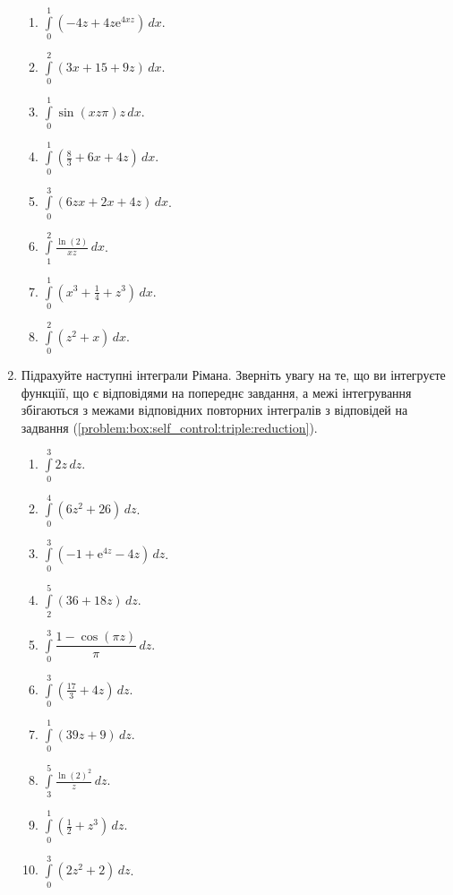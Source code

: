 \begin{enumerate}
\begin{multicols}{2}
\begin{enumerate}[label*=\arabic*.]
        \item $\int\limits_0^1 \left(-4 z+4 z {\mathrm e}^{4 x z}\right) \,dx$.
        \item $\int\limits_0^2 \left(3 x+15+9 z\right) \,dx$.
        \item $\int\limits_0^1 {\sin}{\left(x z \pi \right)} {z} \,dx$.
        \item $\int\limits_0^1 \left(\frac{8}{3}+6 x+4 z\right) \,dx$.
        \item $\int\limits_0^3 \left(6 z x+2 x+4 z\right) \,dx$.
        \item $\int\limits_1^2 \frac{\ln\! \left(2\right)}{x z} \,dx$.
        \item $\int\limits_0^1 \left({x^{3}+\frac{1}{4}+z^{3}}\right) \,dx$.
        \item $\int\limits_0^2 \left(z^{2}+x\right) \,dx$.
    \end{enumerate}
\end{multicols}
\item\label{problem:box:self_control:triple:outer} Підрахуйте наступні інтеграли Рімана. Зверніть увагу на те, що ви інтегруєте функціїї, що є відповідями на попереднє завдання, а межі інтегрування збігаються з межами відповідних повторних інтегралів з відповідей на задвання (\ref{problem:box:self_control:triple:reduction}).
\begin{multicols}{2}
    \begin{enumerate}[label*=\arabic*.]
        \item $\int\limits_0^3 2z \,dz$.
        \item $\int\limits_0^4 \left({6} {z^{2}}{+}{26}\right) \,dz$.
        \item $\int\limits_0^3 \left(-1+{\mathrm e}^{4 z}-4z\right) \,dz$.
        \item $\int\limits_2^5 \left(36 + 18 z\right) \,dz$.
        \item $\int\limits_0^3 \dfrac{1 - \cos\! \left(\pi  z\right)}{\pi} \,dz$.
        \item $\int\limits_0^3\left(\frac{17}{3}+4 z\right) \,dz$.
        \item $\int\limits_0^1 \left({39} {z}{+}{9}\right) \,dz$.
        \item $\int\limits_3^5 \frac{\ln\! \left(2\right)^{2}}{z} \,dz$.
        \item $\int\limits_0^1 \left(\frac{1}{2}+z^{3}\right) \,dz$.
        \item $\int\limits_0^3 \left({2} {z^{2}}{+}{2}\right) \,dz$.
    \end{enumerate}
\end{multicols}
\end{enumerate}
